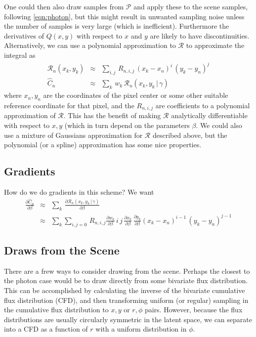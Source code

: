 \documentclass[modern]{aastex6}
\newcommand{\given}{\,|\,}
\newcommand{\countrate}{\hat{C}}
\newcommand{\psf}{\mathcal{P}}
\newcommand{\prf}{\mathcal{R}}
\newcommand{\qe}{Q}
\begin{document}
One could then also draw samples from $\psf$ and apply these to the scene samples, following \ref{eqn:photon},
 but this might result in unwanted sampling noise unless the number of samples is very large (which is inefficient).
Furthermore the derivatives of $\qe(x, y)$ with respect to $x$ and $y$ are likely to have discontinuities.
Alternatively, we can use a polynomial approximation to $\prf$ to approximate the integral as
\begin{eqnarray}
\prf_n(x_k, y_k) & \approx & \sum_{i,j} \, R_{n, i, j} \, (x_k - x_n)^i \, (y_k - y_n)^j \\
\countrate_n & \approx & \sum_k \, w_k \, \prf_n(x_k, y_k \given \gamma) \nonumber
\end{eqnarray}
where $x_n, y_n$ are the coordinates of the pixel center or some other suitable reference coordinate for that pixel, 
and the $R_{n,i,j}$ are coefficients to a polynomial approximation of $\prf$.
This has the benefit of making $\prf$ analytically differentiable with respect to $x, y$ (which in turn depend on the parameters $\beta$.
We could also use a mixture of Gaussians approximation for $\prf$ described above, but the polynomial  (or a spline) approximation has some nice properties.


\subsection{Gradients}
How do we do gradients in this scheme?  We want 
\begin{eqnarray}
\frac{\partial\countrate_n}{\partial\beta} & \approx & \sum_k \, \frac{\partial\prf_n(x_k, y_k \given \gamma)}{\partial \beta} \nonumber \\
& \approx & \sum_k\sum_{i,j=0} \, R_{n, i, j} \frac{\partial w_k}{\partial \beta}\, i \, j \, \frac{\partial x_k}{\partial \beta}\, \frac{\partial y_k}{\partial \beta} (x_k - x_n)^{i-1} \, (y_k - y_n)^{j-1}
\end{eqnarray}


\subsection{Draws from the Scene}
There are a frew ways to consider drawing from the scene.
Perhaps the closest to the photon case would be to draw directly from some bivariate flux distribution.
This can be accomplished by calculating the inverse of the bivariate cumulative flux distribution (CFD),
 and then transforming uniform (or regular) sampling in the cumulative flux distribution to $x, y$ or $r, \phi$ pairs.
However, because the flux distributions are usually circularly symmetric in the latent space, we can separate into a CFD as a function of $r$ with a uniform distribution in $\phi$.
\end{document}
